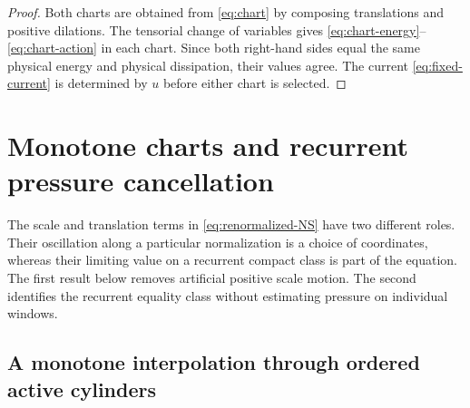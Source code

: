 \documentclass[11pt]{amsart}
\numberwithin{equation}{section}
\theoremstyle{plain}
\theoremstyle{definition}
\theoremstyle{remark}
\begin{document}
\begin{proof}
Both charts are obtained from \eqref{eq:chart} by composing translations and
positive dilations.  The tensorial change of variables gives
\eqref{eq:chart-energy}--\eqref{eq:chart-action} in each chart.  Since both
right-hand sides equal the same physical energy and physical dissipation,
their values agree.  The current \eqref{eq:fixed-current} is determined by
\(u\) before either chart is selected.
\end{proof}

\section{Monotone charts and recurrent pressure cancellation}
\label{sec:recurrent-covariant-rigidity}

The scale and translation terms in \eqref{eq:renormalized-NS} have two
different roles.  Their oscillation along a particular normalization is a
choice of coordinates, whereas their limiting value on a recurrent compact
class is part of the equation.  The first result below removes artificial
positive scale motion.  The second identifies the recurrent equality class
without estimating pressure on individual windows.

\subsection{A monotone interpolation through ordered active cylinders}
\end{document}
